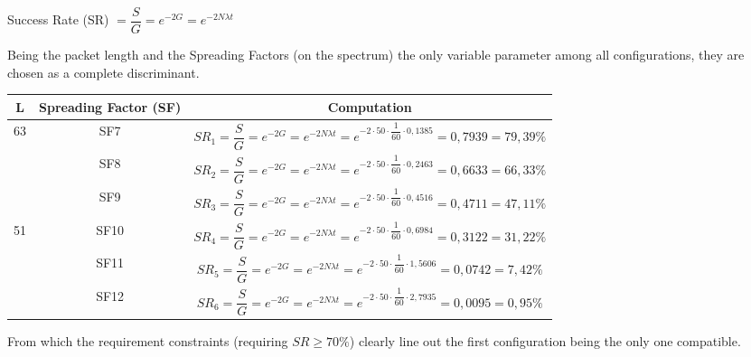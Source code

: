 \documentclass[a4paper,11pt]{article} %
\begin{document}
    \medskip

    Success Rate (SR) $= \dfrac{S}{G} = e^{-2G} = e^{-2N\lambda t}$

    \medskip

    Being the packet length and the Spreading Factors (on the spectrum) the only variable parameter among all configurations, they are chosen as a complete discriminant.

    \bigskip

    \begin{tabular}{|c|c|c|}
        \hline
        L                                  & Spreading Factor (SF) & Computation                                                                                                                                 \\
        \hline
        \multirow{3}{*}{\vspace{-2.3cm}63} & SF7                   & \rule{0pt}{6ex} $SR_{1} = \dfrac{S}{G} = e^{-2G} = e^{-2N\lambda t} = e^{-2 \cdot 50 \cdot \dfrac{1}{60} \cdot 0,1385} = 0,7939 = 79,39\%$ \\[3ex]
        \cline{2-3}
        & SF8                   & \rule{0pt}{6ex} $SR_{2} = \dfrac{S}{G} = e^{-2G} = e^{-2N\lambda t} = e^{-2 \cdot 50 \cdot \dfrac{1}{60} \cdot 0,2463} = 0,6633 = 66,33 \%$ \\[3ex]
        \cline{2-3}
        & SF9                   & \rule{0pt}{6ex} $SR_{3} = \dfrac{S}{G} = e^{-2G} = e^{-2N\lambda t} = e^{-2 \cdot 50 \cdot \dfrac{1}{60} \cdot 0,4516} = 0,4711 = 47,11 \%$ \\[3ex]
        \hline
        \multirow{3}{*}{\vspace{-2.3cm}51} & SF10                  & \rule{0pt}{6ex} $SR_{4} = \dfrac{S}{G} = e^{-2G} = e^{-2N\lambda t} = e^{-2 \cdot 50 \cdot \dfrac{1}{60} \cdot 0,6984} = 0,3122 = 31,22 \%$ \\[3ex]
        \cline{2-3}
        & SF11                  & \rule{0pt}{6ex} $SR_{5} = \dfrac{S}{G} = e^{-2G} = e^{-2N\lambda t} = e^{-2 \cdot 50 \cdot \dfrac{1}{60} \cdot 1,5606} = 0,0742 = 7,42 \%$ \\[3ex]
        \cline{2-3}
        & SF12                  & \rule{0pt}{6ex} $SR_{6} = \dfrac{S}{G} = e^{-2G} = e^{-2N\lambda t} = e^{-2 \cdot 50 \cdot \dfrac{1}{60} \cdot 2,7935} = 0,0095 = 0,95 \%$ \\[3ex]
        \hline
    \end{tabular}

    \bigskip

    From which the requirement constraints (requiring $SR \geq 70\%$) clearly line out the first configuration being the only one compatible.
\end{document}
